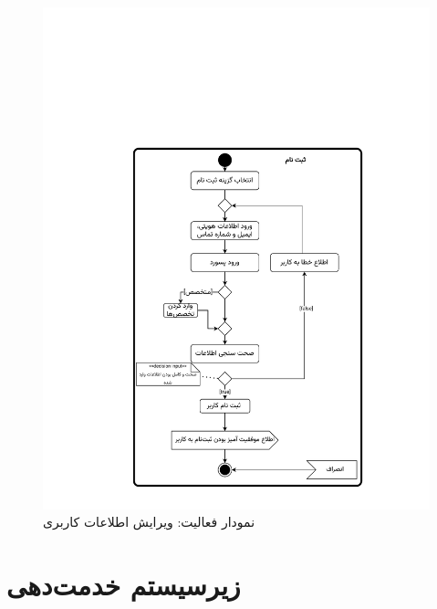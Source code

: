 \begin{figure}
	\centering
	\includegraphics[scale=0.8, page=9]{figs/OOD-activity1-10.pdf}
	\caption{نمودار فعالیت: ویرایش اطلاعات کاربری}
\end{figure}
\FloatBarrier
\newpage


\section{زیرسیستم خدمت‌دهی}


